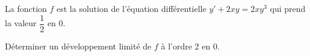 
\begin{exercice}\label{exoautoanalyseCTU-41}



La fonction $f$ est la solution de l'équation différentielle $y'+2xy=2xy^3$ qui prend la valeur $\dfrac{1}{2}$ en 0. 

Déterminer un développement limité de $f$ à l'ordre 2 en 0.







\end{exercice}
